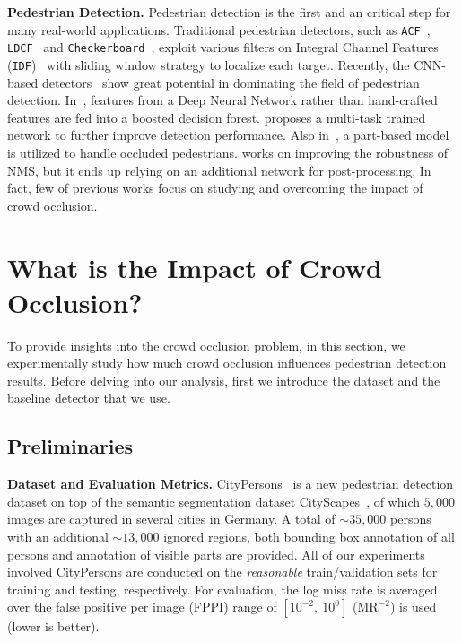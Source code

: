 \documentclass[10pt,twocolumn,letterpaper]{article}
\newcommand{\myparagraph}[1]{{\vspace{0.5em} \noindent \bf #1}}
\begin{document}
\myparagraph{Pedestrian Detection.} Pedestrian detection is the first and an critical step for many real-world applications. Traditional pedestrian detectors, such as \verb'ACF'~\cite{dollar2014fast}, \verb'LDCF'~\cite{nam2014local} and \verb'Checkerboard'~\cite{zhang2015filtered}, exploit various filters on Integral Channel Features (\verb'IDF')~\cite{dollar2009integral} with sliding window strategy to localize each target. Recently, the CNN-based detectors~\cite{li2017scale,zhang2016faster,mao2017can,hosang2015taking,yang2015convolutional} show great potential in dominating the field of pedestrian detection. In~\cite{yang2015convolutional,zhang2016faster}, features from a Deep Neural Network rather than hand-crafted features are fed into a boosted decision forest. \cite{mao2017can} proposes a multi-task trained network to further improve detection performance. Also in~\cite{ouyang2012discriminative,tian2015deep,zhou2017multi}, a part-based model is utilized to handle occluded pedestrians. \cite{Hosang_2017_CVPR} works on improving the robustness of NMS, but it ends up relying on an additional network for post-processing. In fact, few of previous works focus on studying and overcoming the impact of crowd occlusion.

\section{What is the Impact of Crowd Occlusion?}
\label{sec:howmuchanalysis}


To provide insights into the crowd occlusion problem, in this section, we experimentally study how much crowd occlusion influences pedestrian detection results. Before delving into our analysis, first we introduce the dataset and the baseline detector that we use.

\subsection{Preliminaries}
\myparagraph{Dataset and Evaluation Metrics.}
CityPersons~\cite{zhang2017citypersons} is a new pedestrian detection dataset on top of the semantic segmentation dataset CityScapes~\cite{cordts2016cityscapes}, of which $5,000$ images are captured in several cities in Germany. A total of ${\sim}35,000$ persons with an additional ${\sim}13,000$ ignored regions, both bounding box annotation of all persons and annotation of visible parts are provided. All of our experiments involved CityPersons are conducted on the {\it reasonable} train/validation sets for training and testing, respectively. For evaluation, the log miss rate is averaged over the false positive per image (FPPI) range of $[10^{-2},~10^{0}]$ ($\mathrm{MR}^{-2}$) is used (lower is better).
\end{document}
